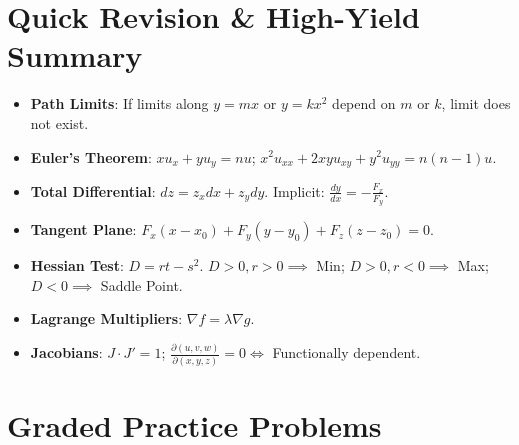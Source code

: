\section{Quick Revision \& High-Yield Summary}

\begin{quickrevision}
\begin{itemize}
    \item \textbf{Path Limits}: If limits along $y=mx$ or $y=kx^2$ depend on $m$ or $k$, limit does not exist.
    \item \textbf{Euler's Theorem}: $x u_x + y u_y = n u$; $x^2 u_{xx} + 2xy u_{xy} + y^2 u_{yy} = n(n-1)u$.
    \item \textbf{Total Differential}: $dz = z_x dx + z_y dy$. Implicit: $\frac{dy}{dx} = -\frac{F_x}{F_y}$.
    \item \textbf{Tangent Plane}: $F_x(x-x_0) + F_y(y-y_0) + F_z(z-z_0) = 0$.
    \item \textbf{Hessian Test}: $D = rt - s^2$. $D > 0, r > 0 \implies$ Min; $D > 0, r < 0 \implies$ Max; $D < 0 \implies$ Saddle Point.
    \item \textbf{Lagrange Multipliers}: $\nabla f = \lambda \nabla g$.
    \item \textbf{Jacobians}: $J \cdot J' = 1$; $\frac{\partial(u,v,w)}{\partial(x,y,z)} = 0 \iff$ Functionally dependent.
\end{itemize}
\end{quickrevision}

\section{Graded Practice Problems}

